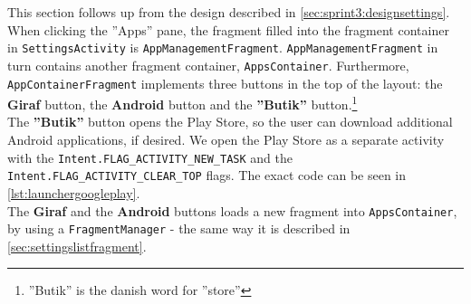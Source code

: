 This section follows up from the design described in \cref{sec:sprint3:designsettings}.
When clicking the ''Apps'' pane, the fragment filled into the fragment container in \lstinline!SettingsActivity! is \lstinline!AppManagementFragment!.
\lstinline!AppManagementFragment! in turn contains another fragment container, \lstinline!AppsContainer!.
Furthermore, \lstinline!AppContainerFragment! implements three buttons in the top of the layout: the \textbf{Giraf} button, the \textbf{Android} button and the \textbf{''Butik''} button.\footnote{''Butik'' is the danish word for ''store''}\\


The \textbf{''Butik''} button opens the  Play Store, so the user can download additional Android applications, if desired. 
We open the Play Store as a separate activity with the \lstinline!Intent.FLAG_ACTIVITY_NEW_TASK! and the \lstinline!Intent.FLAG_ACTIVITY_CLEAR_TOP! flags.
The exact code can be seen in \cref{lst:launchergoogleplay}.\\

The \textbf{Giraf} and the \textbf{Android} buttons loads a new fragment into \lstinline!AppsContainer!, by using a \lstinline!FragmentManager! - the same way it is described in \cref{sec:settingslistfragment}.\\

